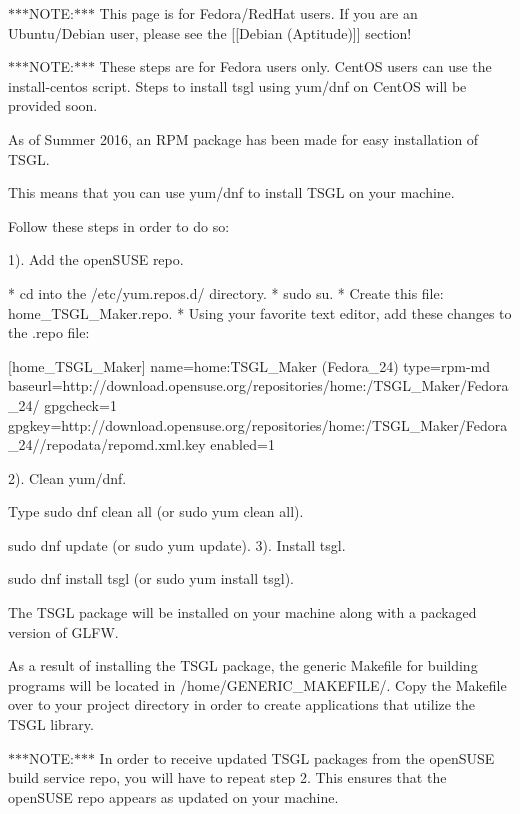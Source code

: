 $\ast$$\ast$$\ast$\-N\-O\-T\-E\-:$\ast$$\ast$$\ast$ This page is for Fedora/\-Red\-Hat users. If you are an Ubuntu/\-Debian user, please see the \mbox{[}\mbox{[}Debian (Aptitude)\mbox{]}\mbox{]} section!

$\ast$$\ast$$\ast$\-N\-O\-T\-E\-:$\ast$$\ast$$\ast$ These steps are for Fedora users only. Cent\-O\-S users can use the install-\/centos script. Steps to install tsgl using yum/dnf on Cent\-O\-S will be provided soon.

As of Summer 2016, an R\-P\-M package has been made for easy installation of T\-S\-G\-L.

This means that you can use yum/dnf to install T\-S\-G\-L on your machine.

Follow these steps in order to do so\-:

1). Add the open\-S\-U\-S\-E repo. \begin{DoxyVerb} * cd into the /etc/yum.repos.d/ directory.
 * sudo su.
 * Create this file: home_TSGL_Maker.repo.
 * Using your favorite text editor, add these changes to the .repo file:

    [home_TSGL_Maker]
    name=home:TSGL_Maker (Fedora_24)
    type=rpm-md
    baseurl=http://download.opensuse.org/repositories/home:/TSGL_Maker/Fedora_24/
    gpgcheck=1
    gpgkey=http://download.opensuse.org/repositories/home:/TSGL_Maker/Fedora_24//repodata/repomd.xml.key    
    enabled=1
\end{DoxyVerb}


2). Clean yum/dnf.
\begin{DoxyItemize}
\item Type sudo dnf clean all (or sudo yum clean all).
\item sudo dnf update (or sudo yum update). 3). Install tsgl.
\item sudo dnf install tsgl (or sudo yum install tsgl).
\end{DoxyItemize}

The T\-S\-G\-L package will be installed on your machine along with a packaged version of G\-L\-F\-W.

As a result of installing the T\-S\-G\-L package, the generic Makefile for building programs will be located in /home/\-G\-E\-N\-E\-R\-I\-C\-\_\-\-M\-A\-K\-E\-F\-I\-L\-E/. Copy the Makefile over to your project directory in order to create applications that utilize the T\-S\-G\-L library.

$\ast$$\ast$$\ast$\-N\-O\-T\-E\-:$\ast$$\ast$$\ast$ In order to receive updated T\-S\-G\-L packages from the open\-S\-U\-S\-E build service repo, you will have to repeat step 2. This ensures that the open\-S\-U\-S\-E repo appears as updated on your machine. 